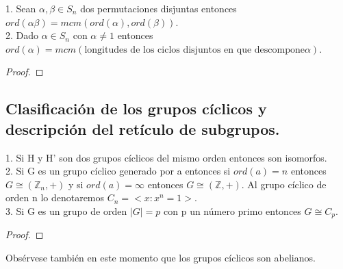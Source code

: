 \begin{nprop}
1. Sean $\alpha,\beta \in S_n$ dos permutaciones disjuntas entonces $ord(\alpha\beta) = mcm(ord(\alpha),ord(\beta))$.\\
2. Dado $\alpha \in S_n$ con $\alpha \neq 1$ entonces $ord(\alpha) = mcm(\text{longitudes de los ciclos disjuntos en que descompone} \alpha)$.
\end{nprop}
\begin{proof}

\end{proof}

\subsection{Clasificación de los grupos cíclicos y descripción del retículo de subgrupos.}

\begin{nth}
1. Si H y H' son dos grupos cíclicos del mismo orden entonces son isomorfos.\\
2. Si G es un grupo cíclico generado por a entonces si $ord(a) = n$ entonces $G \cong (\mathbb{Z}_n,+)$ y si $ord(a) = \infty$ entonces $G \cong (\mathbb{Z},+)$. Al grupo cíclico de orden n lo denotaremos $C_n = <x:x^n = 1>$.\\
3. Si G es un grupo de orden $|G| = p$ con p un número primo entonces $G \cong C_p$.
\end{nth}
\begin{proof}

\end{proof}

Obsérvese también en este momento que los grupos cíclicos son abelianos.

